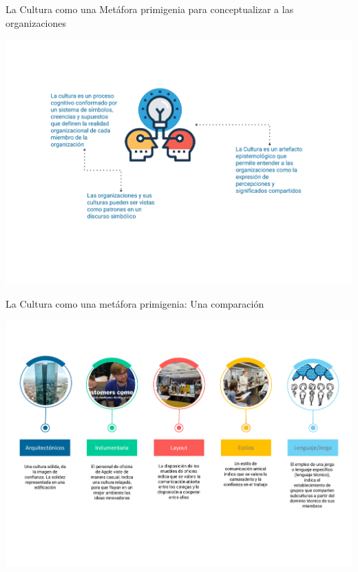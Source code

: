 \documentclass[aspectratio=169]{beamer}
\begin{document}
	\begin{frame}{La Cultura como una Metáfora primigenia para conceptualizar a las organizaciones}
		\begin{center}
			\includegraphics[height=\textheight]{./figures/L8.pdf}
		\end{center}
	\end{frame}

	\begin{frame}{La Cultura como una metáfora primigenia: Una comparación}
		\begin{center}
			\includegraphics[height=\textheight]{./figures/L9.pdf}
		\end{center}
	\end{frame}
\end{document}
